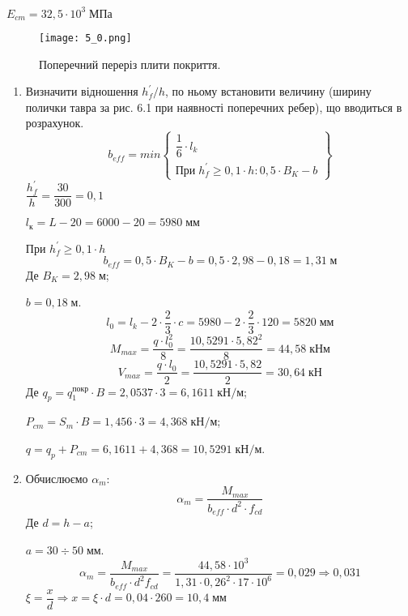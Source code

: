 \documentclass[a4paper,14pt]{article}
\begin{document}
$E_{cm} = 32,5 \cdot 10^3\;\textit{МПа}$
\begin{figure}[h!]
    \begin{center}
        \texttt{[image: 5\_0.png]}
        \caption{Поперечний переріз плити покриття.}\label{ris5_0} 
    \end{center}
\end{figure} 
\begin{enumerate}
    \item Визначити відношення $h_f^\prime/h$, по ньому встановити величину   (ширину полички тавра за рис. 6.1 при наявності поперечних ребер), що вводиться в розрахунок.
        \begin{equation}
            b_{eff} = min\begin{Bmatrix}
                \dfrac{1}{6} \cdot l_k \\
                \textit{При}\;h_f^\prime \geq 0,1 \cdot h : 0,5 \cdot B_K - b
            \end{Bmatrix}
        \end{equation}
        $\dfrac{h_f^\prime}{h} = \dfrac{30}{300} = 0,1$

        $l_{\textit{к}} = L - 20 = 6000 - 20 = 5980\;\textit{мм}$

        При $h_f^\prime \geq 0,1 \cdot h$
        $$b_{eff} = 0,5 \cdot B_K - b = 0,5 \cdot 2,98 - 0,18 = 1,31\;\textit{м}$$
        Де $B_K = 2,98\;\textit{м}$;

        $b = 0,18\;\textit{м}$.
        $$l_0 = l_k - 2 \cdot \dfrac{2}{3} \cdot c = 5980 - 2 \cdot \dfrac{2}{3} \cdot 120 = 5820\;\textit{мм}$$
        $$M_{max} = \dfrac{q \cdot l_0^2}{8} = \dfrac{10,5291 \cdot 5,82^2}{8} = 44,58\;\textit{кНм}$$
        $$V_{max} = \dfrac{q \cdot l_0}{2} = \dfrac{10,5291 \cdot 5,82}{2} = 30,64\;\textit{кН}$$
        Де $q_p = q_1^{\textit{покр}} \cdot B = 2,0537 \cdot 3 = 6,1611\;\textit{кН/м}$;

        $P_{cm} = S_m \cdot B = 1,456 \cdot 3 = 4,368\;\textit{кН/м}$;

        $q = q_p + P_{cm} = 6,1611 + 4,368 = 10,5291\;\textit{кН/м}$.
    \item Обчислюємо $\alpha_m$:
        \begin{equation}
            \alpha_m = \dfrac{M_{max}}{b_{eff} \cdot d^2 \cdot f_{cd}}
        \end{equation}
        Де $d = h - a$;

        $a = 30 \div 50\;\textit{мм}$.
        $$\alpha_m = \dfrac{M_{max}}{b_{eff} \cdot d^2f_{cd}} = \dfrac{44,58 \cdot 10^3}{1,31 \cdot 0,26^2 \cdot 17 \cdot 10^6} = 0,029 \Longrightarrow 0,031$$
        $\xi = \dfrac{x}{d} \Longrightarrow x = \xi \cdot d = 0,04 \cdot 260 = 10,4\;\textit{мм}$


\end{enumerate}
\end{document}
